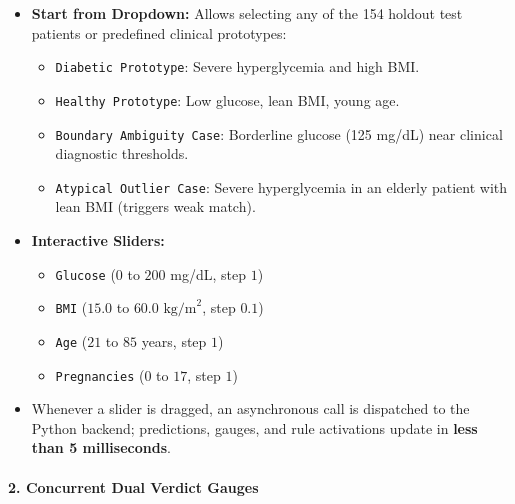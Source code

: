 \documentclass[10pt,a4paper]{article}
\providecommand{\tightlist}{\setlength{\itemsep}{1pt}\setlength{\parskip}{1pt}}
\begin{document}
\begin{itemize}
\tightlist
\item
  \textbf{Start from Dropdown:} Allows selecting any of the 154 holdout
  test patients or predefined clinical prototypes:

  \begin{itemize}
  \tightlist
  \item
    \texttt{Diabetic\ Prototype}: Severe hyperglycemia and high BMI.
  \item
    \texttt{Healthy\ Prototype}: Low glucose, lean BMI, young age.
  \item
    \texttt{Boundary\ Ambiguity\ Case}: Borderline glucose (125 mg/dL)
    near clinical diagnostic thresholds.
  \item
    \texttt{Atypical\ Outlier\ Case}: Severe hyperglycemia in an elderly
    patient with lean BMI (triggers weak match).
  \end{itemize}
\item
  \textbf{Interactive Sliders:}

  \begin{itemize}
  \tightlist
  \item
    \texttt{Glucose} (\(0\) to \(200\) mg/dL, step \(1\))
  \item
    \texttt{BMI} (\(15.0\) to \(60.0 \text{ kg/m}^2\), step \(0.1\))
  \item
    \texttt{Age} (\(21\) to \(85\) years, step \(1\))
  \item
    \texttt{Pregnancies} (\(0\) to \(17\), step \(1\))
  \end{itemize}
\item
  Whenever a slider is dragged, an asynchronous call is dispatched to
  the Python backend; predictions, gauges, and rule activations update
  in \textbf{less than 5 milliseconds}.
\end{itemize}

\paragraph{2. Concurrent Dual Verdict
Gauges}\label{concurrent-dual-verdict-gauges}
\end{document}
